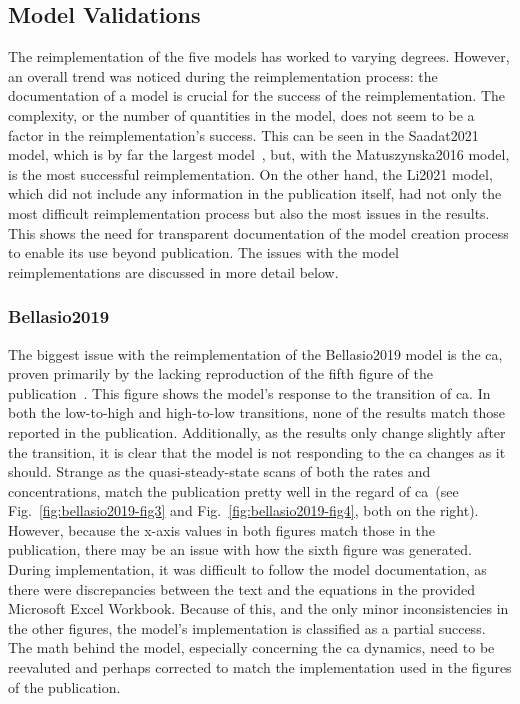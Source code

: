 \subsection{Model Validations}

The reimplementation of the five models has worked to varying degrees. However, an overall trend was noticed during the reimplementation process: the documentation of a model is crucial for the success of the reimplementation. The complexity, or the number of quantities in the model, does not seem to be a factor in the reimplementation's success. This can be seen in the Saadat2021 model, which is by far the largest model~, but, with the Matuszynska2016 model, is the most successful reimplementation. On the other hand, the Li2021 model, which did not include any information in the publication itself, had not only the most difficult reimplementation process but also the most issues in the results. This shows the need for transparent documentation of the model creation process to enable its use beyond publication. The issues with the model reimplementations are discussed in more detail below.

\subsubsection{Bellasio2019}

The biggest issue with the reimplementation of the Bellasio2019 model is the \gls{ca}, proven primarily by the lacking reproduction of the fifth figure of the publication~. This figure shows the model's response to the transition of \gls{ca}. In both the low-to-high and high-to-low transitions, none of the results match those reported in the publication. Additionally, as the results only change slightly after the transition, it is clear that the model is not responding to the \gls{ca} changes as it should. Strange as the quasi-steady-state scans of both the rates and concentrations, match the publication pretty well in the regard of \gls{ca}~(see Fig.~\ref{fig:bellasio2019-fig3} and Fig.~\ref{fig:bellasio2019-fig4}, both on the right). However, because the x-axis values in both figures match those in the publication, there may be an issue with how the sixth figure was generated. During implementation, it was difficult to follow the model documentation, as there were discrepancies between the text and the equations in the provided Microsoft Excel Workbook. Because of this, and the only minor inconsistencies in the other figures, the model's implementation is classified as a partial success. The math behind the model, especially concerning the \gls{ca} dynamics, need to be reevaluted and perhaps corrected to match the implementation used in the figures of the publication.
